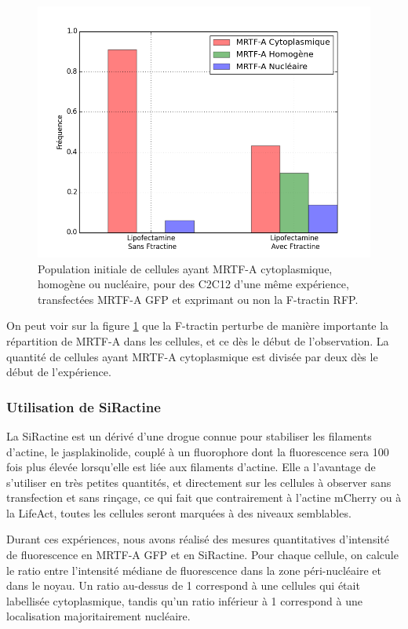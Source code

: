 \begin{figure}
\includegraphics[scale=0.4]{Figures/Ftractine.png} 
\caption{Population initiale de cellules ayant MRTF-A cytoplasmique, homogène ou nucléaire, pour des C2C12 d'une même expérience, transfectées MRTF-A GFP et exprimant ou non la F-tractin RFP. \label{Ftractin}}
\end{figure}

On peut voir sur la figure \ref{Ftractin} que la F-tractin perturbe de manière importante la répartition de MRTF-A dans les cellules, et ce dès le début de l'observation. 
La quantité de cellules ayant MRTF-A cytoplasmique est divisée par deux dès le début de l'expérience. 


\subsubsection{Utilisation de SiRactine}
La SiRactine est un dérivé d'une drogue connue pour stabiliser les filaments d'actine, le jasplakinolide, couplé à un fluorophore dont la fluorescence sera 100 fois plus élevée lorsqu'elle est liée aux filaments d'actine. 
Elle a l'avantage de s'utiliser en très petites quantités, et directement sur les cellules à observer sans transfection et sans rinçage, ce qui fait que contrairement à l'actine mCherry ou à la LifeAct, toutes les cellules seront marquées à des niveaux semblables. 

Durant ces expériences, nous avons réalisé des mesures quantitatives d'intensité de fluorescence en MRTF-A GFP et en SiRactine. Pour chaque cellule, on calcule le ratio entre l'intensité médiane de fluorescence dans la zone péri-nucléaire et dans le noyau. Un ratio au-dessus de 1 correspond à une cellules qui était labellisée cytoplasmique, tandis qu'un ratio inférieur à 1 correspond à une localisation majoritairement nucléaire. 






